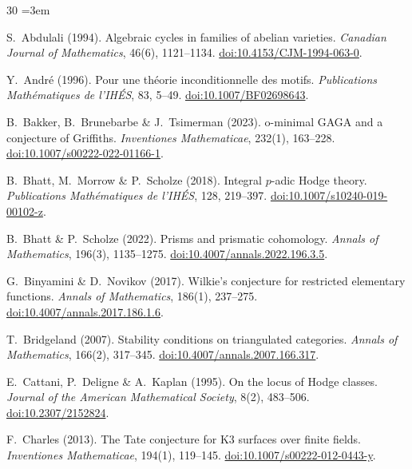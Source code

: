 \documentclass[aps,prd,twocolumn,superscriptaddress,nofootinbib]{revtex4-2}
\theoremstyle{definition}
\theoremstyle{remark}
\begin{document}
\begin{thebibliography}{30}
\frenchspacing\sloppy\emergencystretch=3em\raggedright

S.~Abdulali (1994).
Algebraic cycles in families of abelian varieties.
\textit{Canadian Journal of Mathematics}, 46(6), 1121--1134.
\href{https://doi.org/10.4153/CJM-1994-063-0}{doi:10.4153/CJM-1994-063-0}.

Y.~Andr\'e (1996).
Pour une th\'eorie inconditionnelle des motifs.
\textit{Publications Math\'ematiques de l'IH\'ES}, 83, 5--49.
\href{https://doi.org/10.1007/BF02698643}{doi:10.1007/BF02698643}.

B.~Bakker, B.~Brunebarbe \& J.~Tsimerman (2023).
o-minimal GAGA and a conjecture of Griffiths.
\textit{Inventiones Mathematicae}, 232(1), 163--228.
\href{https://doi.org/10.1007/s00222-022-01166-1}{doi:10.1007/s00222-022-01166-1}.

B.~Bhatt, M.~Morrow \& P.~Scholze (2018).
Integral $p$-adic Hodge theory.
\textit{Publications Math\'ematiques de l'IH\'ES}, 128, 219--397.
\href{https://doi.org/10.1007/s10240-019-00102-z}{doi:10.1007/s10240-019-00102-z}.

B.~Bhatt \& P.~Scholze (2022).
Prisms and prismatic cohomology.
\textit{Annals of Mathematics}, 196(3), 1135--1275.
\href{https://doi.org/10.4007/annals.2022.196.3.5}{doi:10.4007/annals.2022.196.3.5}.

G.~Binyamini \& D.~Novikov (2017).
Wilkie's conjecture for restricted elementary functions.
\textit{Annals of Mathematics}, 186(1), 237--275.
\href{https://doi.org/10.4007/annals.2017.186.1.6}{doi:10.4007/annals.2017.186.1.6}.

T.~Bridgeland (2007).
Stability conditions on triangulated categories.
\textit{Annals of Mathematics}, 166(2), 317--345.
\href{https://doi.org/10.4007/annals.2007.166.317}{doi:10.4007/annals.2007.166.317}.

E.~Cattani, P.~Deligne \& A.~Kaplan (1995).
On the locus of Hodge classes.
\textit{Journal of the American Mathematical Society}, 8(2), 483--506.
\href{https://doi.org/10.2307/2152824}{doi:10.2307/2152824}.

F.~Charles (2013).
The Tate conjecture for K3 surfaces over finite fields.
\textit{Inventiones Mathematicae}, 194(1), 119--145.
\href{https://doi.org/10.1007/s00222-012-0443-y}{doi:10.1007/s00222-012-0443-y}.


\end{thebibliography}
\end{document}
